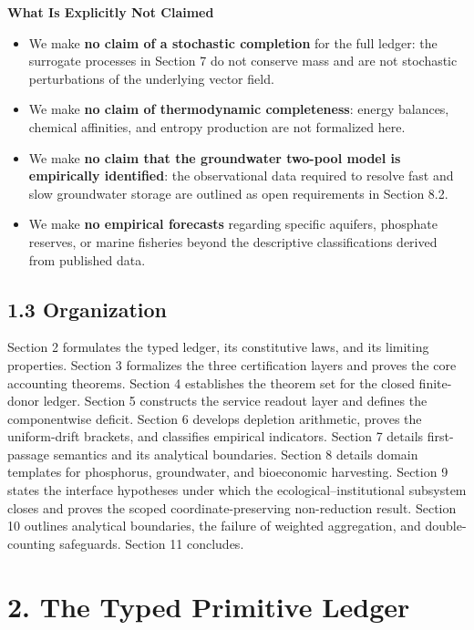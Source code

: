 \documentclass[11pt]{article}
\begin{document}
\textbf{What Is Explicitly Not Claimed}

\begin{itemize}\setlength{\itemsep}{2pt}
\item We make \textbf{no claim of a stochastic completion} for the full ledger: the surrogate processes in Section 7 do not conserve mass and are not stochastic perturbations of the underlying vector field.
\item We make \textbf{no claim of thermodynamic completeness}: energy balances, chemical affinities, and entropy production are not formalized here.
\item We make \textbf{no claim that the groundwater two-pool model is empirically identified}: the observational data required to resolve fast and slow groundwater storage are outlined as open requirements in Section 8.2.
\item We make \textbf{no empirical forecasts} regarding specific aquifers, phosphate reserves, or marine fisheries beyond the descriptive classifications derived from published data.
\end{itemize}

\subsection*{1.3 Organization}\label{13-organization}

Section 2 formulates the typed ledger, its constitutive laws, and its limiting properties. Section 3 formalizes the three certification layers and proves the core accounting theorems. Section 4 establishes the theorem set for the closed finite-donor ledger. Section 5 constructs the service readout layer and defines the componentwise deficit. Section 6 develops depletion arithmetic, proves the uniform-drift brackets, and classifies empirical indicators. Section 7 details first-passage semantics and its analytical boundaries. Section 8 details domain templates for phosphorus, groundwater, and bioeconomic harvesting. Section 9 states the interface hypotheses under which the ecological--institutional subsystem closes and proves the scoped coordinate-preserving non-reduction result. Section 10 outlines analytical boundaries, the failure of weighted aggregation, and double-counting safeguards. Section 11 concludes.

\vspace{0.8em}

\section*{2. The Typed Primitive Ledger}\label{2-the-typed-primitive-ledger}
\end{document}
